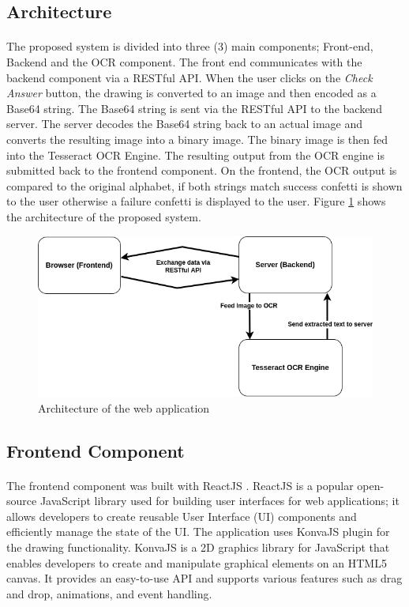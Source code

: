 \documentclass[twocolumn,oneside,12pt,a4paper]{article}
\begin{document}
\subsection{Architecture}
\paragraph*{}
The proposed system is divided into three (3) main components; Front-end, Backend and the OCR component. The front end communicates with the backend component via a RESTful API. When the user clicks on the \textit{Check Answer} button, the drawing is converted to an image and then encoded as a Base64 string. The Base64 string is sent via the RESTful API to the backend server. The server decodes the Base64 string back to an actual image and converts the resulting image into a binary image. The binary image is then fed into the Tesseract OCR Engine. The resulting output from the OCR engine is submitted back to the frontend component. On the frontend, the OCR output is compared to the original alphabet, if both strings match success confetti is shown to the user otherwise a failure confetti is displayed to the user. Figure \ref{fig:system_architecture} shows the architecture of the proposed system.

\begin{figure}
    \centering
    \includegraphics[width=\linewidth]{../system-component.png}
    \caption{Architecture of the web application}
    \label{fig:system_architecture}
\end{figure}

\subsection{Frontend Component}
\paragraph*{}
The frontend component was built with ReactJS \cite{noauthor_react_2023}. ReactJS is a popular open-source JavaScript library used for building user interfaces for web applications; it allows developers to create reusable User Interface (UI) components and efficiently manage the state of the UI. The application uses KonvaJS \cite{noauthor_konvajs_2023} plugin for the drawing functionality. KonvaJS is a 2D graphics library for JavaScript that enables developers to create and manipulate graphical elements on an HTML5 canvas. It provides an easy-to-use API and supports various features such as drag and drop, animations, and event handling.
\end{document}
